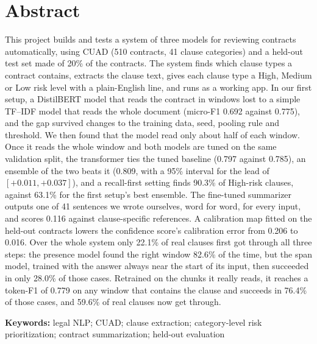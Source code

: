 \section*{Abstract}
This project builds and tests a system of three models for reviewing contracts automatically, using CUAD (510 contracts, 41 clause categories) and a held-out test set made of 20\% of the contracts. The system finds which clause types a contract contains, extracts the clause text, gives each clause type a High, Medium or Low risk level with a plain-English line, and runs as a working app. In our first setup, a DistilBERT model that reads the contract in windows lost to a simple TF--IDF model that reads the whole document (micro-F1 0.692 against 0.775), and the gap survived changes to the training data, seed, pooling rule and threshold. We then found that the model read only about half of each window. Once it reads the whole window and both models are tuned on the same validation split, the transformer ties the tuned baseline (0.797 against 0.785), an ensemble of the two beats it (0.809, with a 95\% interval for the lead of $[+0.011, +0.037]$), and a recall-first setting finds 90.3\% of High-risk clauses, against 63.1\% for the first setup's best ensemble. The fine-tuned summarizer outputs one of 41 sentences we wrote ourselves, word for word, for every input, and scores 0.116 against clause-specific references. A calibration map fitted on the held-out contracts lowers the confidence score's calibration error from 0.206 to 0.016. Over the whole system only 22.1\% of real clauses first got through all three steps: the presence model found the right window 82.6\% of the time, but the span model, trained with the answer always near the start of its input, then succeeded in only 28.0\% of those cases. Retrained on the chunks it really reads, it reaches a token-F1 of 0.779 on any window that contains the clause and succeeds in 76.4\% of those cases, and 59.6\% of real clauses now get through.

\vspace{1cm}
\textbf{Keywords:} legal NLP; CUAD; clause extraction; category-level risk prioritization; contract summarization; held-out evaluation
\pagebreak
